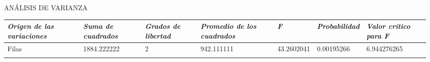 \documentclass[]{book}
\theoremstyle{definition}
\theoremstyle{definition}
\theoremstyle{definition}
\theoremstyle{remark}
\begin{document}
ANÁLISIS DE VARIANZA

\begin{longtable}[]{@{}lllllll@{}}
\toprule
\begin{minipage}[b]{0.15\columnwidth}\raggedright
\emph{Origen de las variaciones}\strut
\end{minipage} & \begin{minipage}[b]{0.11\columnwidth}\raggedright
\emph{Suma de cuadrados}\strut
\end{minipage} & \begin{minipage}[b]{0.12\columnwidth}\raggedright
\emph{Grados de libertad}\strut
\end{minipage} & \begin{minipage}[b]{0.15\columnwidth}\raggedright
\emph{Promedio de los cuadrados}\strut
\end{minipage} & \begin{minipage}[b]{0.06\columnwidth}\raggedright
\emph{F}\strut
\end{minipage} & \begin{minipage}[b]{0.08\columnwidth}\raggedright
\emph{Probabilidad}\strut
\end{minipage} & \begin{minipage}[b]{0.13\columnwidth}\raggedright
\emph{Valor crítico para F}\strut
\end{minipage}\tabularnewline
\midrule
\endhead
\begin{minipage}[t]{0.15\columnwidth}\raggedright
Filas\strut
\end{minipage} & \begin{minipage}[t]{0.11\columnwidth}\raggedright
1884.222222\strut
\end{minipage} & \begin{minipage}[t]{0.12\columnwidth}\raggedright
2\strut
\end{minipage} & \begin{minipage}[t]{0.15\columnwidth}\raggedright
942.111111\strut
\end{minipage} & \begin{minipage}[t]{0.06\columnwidth}\raggedright
43.2602041\strut
\end{minipage} & \begin{minipage}[t]{0.08\columnwidth}\raggedright
0.00195266\strut
\end{minipage} & \begin{minipage}[t]{0.13\columnwidth}\raggedright
6.944276265\strut
\end{minipage}\tabularnewline
\begin{minipage}[t]{0.15\columnwidth}\raggedright

\end{minipage}
\end{longtable}
\end{document}
